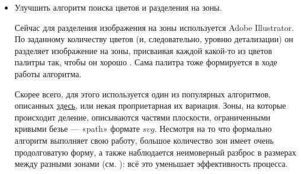 \documentclass[11pt]{article}
\begin{document}
\begin{itemize}
        \item Улучшить алгоритм поиска цветов и разделения на зоны.

                Сейчас для разделения изображения на зоны используется Adobe Illustrator.
                По заданному количеству цветов (и, следовательно, уровню детализации) он разделяет изображение на зоны,
                присваивая каждой какой-то из цветов палитры так, чтобы он хорошо .
                Сама палитра тоже формируется в ходе работы алгоритма.

                Скорее всего, для этого используется один из популярных алгоритмов, описанных \href{https://en.wikipedia.org/wiki/Color_quantization}{здесь}, или некая проприетарная их вариация.
                Зоны, на которые происходит деление, описываются частями плоскости, ограниченными кривыми безье — «path»  формате $svg$.
                Несмотря на то что формально алгоритм выполняет свою работу, большое количество зон имеет очень продолговатую форму,
                а также наблюдается неимоверный разброс в размерах между разными зонами (см. ):
                всё это уменьшает эффективность процесса.





    \end{itemize}
\end{document}
